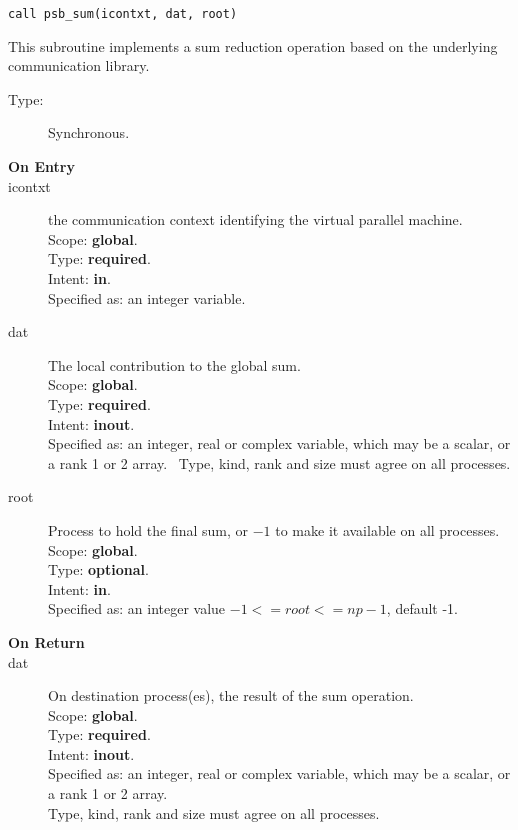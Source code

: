\begin{verbatim}
call psb_sum(icontxt, dat, root)
\end{verbatim}

This subroutine implements a sum reduction  operation based on the
underlying communication library. 
\begin{description}
\item[Type:] Synchronous.
\item[\bf  On Entry ]
\item[icontxt] the communication context identifying the virtual
  parallel machine.\\
Scope: {\bf global}.\\
Type: {\bf required}.\\
Intent: {\bf in}.\\
Specified as: an integer variable.
\item[dat] The local contribution to the global sum.\\
Scope: {\bf global}.\\
Type: {\bf required}.\\
Intent: {\bf inout}.\\
Specified as: an integer, real or complex variable, which may be a
scalar, or a rank 1 or 2 array. \
Type, kind, rank and size must agree on all processes.
\item[root] Process to hold the final sum, or $-1$ to make it available
  on all processes.\\
Scope: {\bf global}.\\
Type: {\bf optional}.\\
Intent: {\bf in}.\\
Specified as: an integer value $-1<= root <= np-1$, default -1. \
\end{description}


\begin{description}
\item[\bf On Return]
\item[dat] On destination process(es), the result of the sum operation.\\
Scope: {\bf global}.\\
Type: {\bf required}.\\
Intent: {\bf inout}.\\
Specified as: an integer, real or complex variable, which may be a
scalar, or a rank 1 or 2 array. \\
Type, kind, rank and size must agree on all processes.
\end{description}

